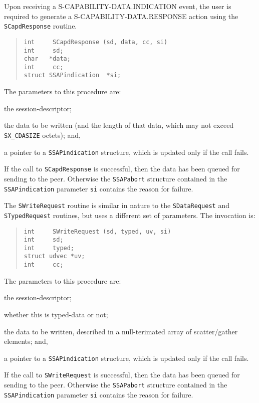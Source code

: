Upon receiving a {\sf S-CAPABILITY-DATA.INDICATION\/} event,
the user is required to generate a {\sf S-CAPABILITY-DATA.RESPONSE\/} action
using the \verb"SCapdResponse" routine.
\begin{quote}\small\begin{verbatim}
int     SCapdResponse (sd, data, cc, si)
int     sd;
char   *data;
int     cc;
struct SSAPindication  *si;
\end{verbatim}\end{quote}
The parameters to this procedure are:
\begin{describe}
\item[\verb"sd":] the session-descriptor;

\item[\verb"data"/\verb"cc":] the data to be written (and the length of that
data, which may not exceed \verb"SX_CDASIZE" octets);
and,

\item[\verb"si":] a pointer to a \verb"SSAPindication" structure, which is updated
only if the call fails.
\end{describe}
If  the call to \verb"SCapdResponse" is successful,
then the data has been queued for sending to the peer.
Otherwise the \verb"SSAPabort" structure contained in
the \verb"SSAPindication" parameter
\verb"si" contains the reason for failure.

The \verb"SWriteRequest" routine is similar in nature to the
\verb"SDataRequest" and \verb"STypedRequest" routines,
but uses a different set of parameters.
The invocation is:
\begin{quote}\small\begin{verbatim}
int     SWriteRequest (sd, typed, uv, si)
int     sd;
int     typed;
struct udvec *uv;
int     cc;
\end{verbatim}\end{quote}
The parameters to this procedure are:
\begin{describe}
\item[\verb"sd":] the session-descriptor;

\item[\verb"typed":] whether this is typed-data or not;

\item[\verb"uv":] the data to be written,
described in a null-terimated array of scatter/gather elements;
and,

\item[\verb"si":] a pointer to a \verb"SSAPindication" structure, which is updated
only if the call fails.
\end{describe}
If the call to \verb"SWriteRequest" is successful,
then the data has been queued for sending to the peer.
Otherwise the \verb"SSAPabort" structure contained in
the \verb"SSAPindication" parameter
\verb"si" contains the reason for failure.


